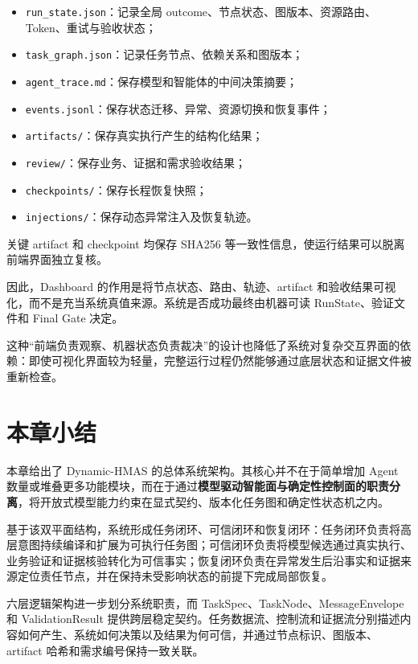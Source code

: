 \documentclass[UTF8,a4paper,12pt,oneside]{ctexbook}
\begin{document}
\begin{itemize}
    \item \texttt{run\_state.json}：记录全局 outcome、节点状态、图版本、资源路由、Token、重试与验收状态；
    \item \texttt{task\_graph.json}：记录任务节点、依赖关系和图版本；
    \item \texttt{agent\_trace.md}：保存模型和智能体的中间决策摘要；
    \item \texttt{events.jsonl}：保存状态迁移、异常、资源切换和恢复事件；
    \item \texttt{artifacts/}：保存真实执行产生的结构化结果；
    \item \texttt{review/}：保存业务、证据和需求验收结果；
    \item \texttt{checkpoints/}：保存长程恢复快照；
    \item \texttt{injections/}：保存动态异常注入及恢复轨迹。
\end{itemize}

关键 artifact 和 checkpoint 均保存 SHA256 等一致性信息，使运行结果可以脱离前端界面独立复核。

因此，Dashboard 的作用是将节点状态、路由、轨迹、artifact 和验收结果可视化，而不是充当系统真值来源。系统是否成功最终由机器可读 RunState、验证文件和 Final Gate 决定。

这种“前端负责观察、机器状态负责裁决”的设计也降低了系统对复杂交互界面的依赖：即使可视化界面较为轻量，完整运行过程仍然能够通过底层状态和证据文件被重新检查。


\section{本章小结}

本章给出了 Dynamic-HMAS 的总体系统架构。其核心并不在于简单增加 Agent 数量或堆叠更多功能模块，而在于通过\textbf{模型驱动智能面与确定性控制面的职责分离}，将开放式模型能力约束在显式契约、版本化任务图和确定性状态机之内。

基于该双平面结构，系统形成任务闭环、可信闭环和恢复闭环：任务闭环负责将高层意图持续编译和扩展为可执行任务图；可信闭环负责将模型候选通过真实执行、业务验证和证据核验转化为可信事实；恢复闭环负责在异常发生后沿事实和证据来源定位责任节点，并在保持未受影响状态的前提下完成局部恢复。

六层逻辑架构进一步划分系统职责，而 TaskSpec、TaskNode、MessageEnvelope 和 ValidationResult 提供跨层稳定契约。任务数据流、控制流和证据流分别描述内容如何产生、系统如何决策以及结果为何可信，并通过节点标识、图版本、artifact 哈希和需求编号保持一致关联。
\end{document}
